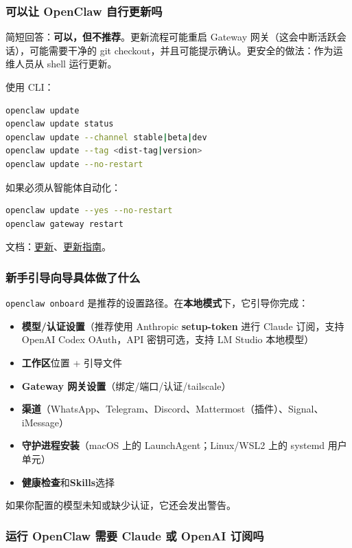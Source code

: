 \subsubsection{可以让 OpenClaw 自行更新吗}


简短回答：\textbf{可以，但不推荐}。更新流程可能重启 Gateway 网关（这会中断活跃会话），可能需要干净的 git checkout，并且可能提示确认。更安全的做法：作为运维人员从 shell 运行更新。

使用 CLI：

\begin{lstlisting}[language=bash]
openclaw update
openclaw update status
openclaw update --channel stable|beta|dev
openclaw update --tag <dist-tag|version>
openclaw update --no-restart
\end{lstlisting}


如果必须从智能体自动化：

\begin{lstlisting}[language=bash]
openclaw update --yes --no-restart
openclaw gateway restart
\end{lstlisting}


文档：\href{/cli/update}{更新}、\href{/install/updating}{更新指南}。

\subsubsection{新手引导向导具体做了什么}


\texttt{openclaw onboard} 是推荐的设置路径。在\textbf{本地模式}下，它引导你完成：

\begin{itemize}
  \item \textbf{模型/认证设置}（推荐使用 Anthropic \textbf{setup-token} 进行 Claude 订阅，支持 OpenAI Codex OAuth，API 密钥可选，支持 LM Studio 本地模型）
  \item \textbf{工作区}位置 + 引导文件
  \item \textbf{Gateway 网关设置}（绑定/端口/认证/tailscale）
  \item \textbf{渠道}（WhatsApp、Telegram、Discord、Mattermost（插件）、Signal、iMessage）
  \item \textbf{守护进程安装}（macOS 上的 LaunchAgent；Linux/WSL2 上的 systemd 用户单元）
  \item \textbf{健康检查}和\textbf{Skills}选择
\end{itemize}


如果你配置的模型未知或缺少认证，它还会发出警告。

\subsubsection{运行 OpenClaw 需要 Claude 或 OpenAI 订阅吗}


